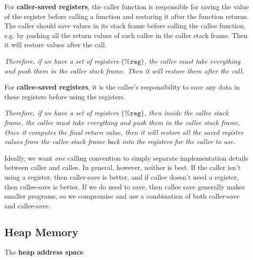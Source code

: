   \begin{definition}
    For \textbf{caller-saved registers}, the caller function is responsible for saving the value of the register before calling a function and restoring it after the function returns. The caller should save values in its stack frame before calling the callee function, e.g. by pushing all the return values of each callee in the caller stack frame. Then it will restore values after the call. 

    \begin{center}
      \textit{Therefore, if we have a set of registers $\{\texttt{\%reg}\}$, the caller must take everything and push them in the caller stack frame. Then it will restore them after the call.}
    \end{center}
  \end{definition}

  \begin{definition}
    For \textbf{callee-saved registers}, it is the callee's responsibility to save any data in these registers before using the registers. 

    \begin{center} 
      \textit{Therefore, if we have a set of registers $\{\texttt{\%reg}\}$, then inside the callee stack frame, the callee must take everything and push them in the callee stack frame. Once it computes the final return value, then it will restore all the saved register values from the callee stack frame back into the registers for the caller to use.}
    \end{center}
  \end{definition}

  Ideally, we want \textit{one} calling convention to simply separate implementation details between caller and callee. In general, however, neither is best. If the caller isn't using a register, then caller-save is better, and if callee doesn't need a register, then callee-save is better. If we do need to save, then callee save generally makes smaller programs, so we compromise and use a combination of both caller-save and callee-save. 

\subsection{Heap Memory}

  \begin{definition}
    The \textbf{heap address space} 
  \end{definition}

